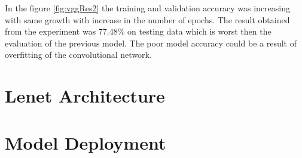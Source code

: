 In the figure \ref{fig:vggRes2} the training and validation accuracy 
was increasing with same growth with increase in the number of epochs.
The result obtained from the experiment was 77.48\% on testing data which is 
worst then the evaluation of the previous model. The poor model accuracy could be a result 
of overfitting of the convolutional network.

\pagebreak
\section{Lenet Architecture}

\pagebreak
\section{Model Deployment}
